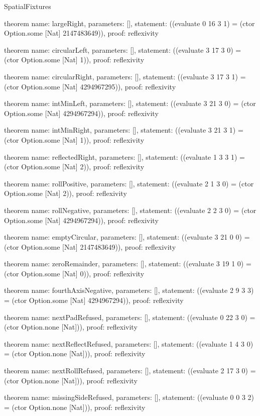 \begin{lexlean}{SpatialFixtures}
\begin{semanticmodule}
theorem{
  name: largeRight,
  parameters: [],
  statement: ((evaluate 0 16 3 1) = (ctor Option.some [Nat] 2147483649)),
  proof: reflexivity{}
}

theorem{
  name: circularLeft,
  parameters: [],
  statement: ((evaluate 3 17 3 0) = (ctor Option.some [Nat] 1)),
  proof: reflexivity{}
}

theorem{
  name: circularRight,
  parameters: [],
  statement: ((evaluate 3 17 3 1) = (ctor Option.some [Nat] 4294967295)),
  proof: reflexivity{}
}

theorem{
  name: intMinLeft,
  parameters: [],
  statement: ((evaluate 3 21 3 0) = (ctor Option.some [Nat] 4294967294)),
  proof: reflexivity{}
}

theorem{
  name: intMinRight,
  parameters: [],
  statement: ((evaluate 3 21 3 1) = (ctor Option.some [Nat] 1)),
  proof: reflexivity{}
}

theorem{
  name: reflectedRight,
  parameters: [],
  statement: ((evaluate 1 3 3 1) = (ctor Option.some [Nat] 2)),
  proof: reflexivity{}
}

theorem{
  name: rollPositive,
  parameters: [],
  statement: ((evaluate 2 1 3 0) = (ctor Option.some [Nat] 2)),
  proof: reflexivity{}
}

theorem{
  name: rollNegative,
  parameters: [],
  statement: ((evaluate 2 2 3 0) = (ctor Option.some [Nat] 4294967294)),
  proof: reflexivity{}
}

theorem{
  name: emptyCircular,
  parameters: [],
  statement: ((evaluate 3 21 0 0) = (ctor Option.some [Nat] 2147483649)),
  proof: reflexivity{}
}

theorem{
  name: zeroRemainder,
  parameters: [],
  statement: ((evaluate 3 19 1 0) = (ctor Option.some [Nat] 0)),
  proof: reflexivity{}
}

theorem{
  name: fourthAxisNegative,
  parameters: [],
  statement: ((evaluate 2 9 3 3) = (ctor Option.some [Nat] 4294967294)),
  proof: reflexivity{}
}

theorem{
  name: nextPadRefused,
  parameters: [],
  statement: ((evaluate 0 22 3 0) = (ctor Option.none [Nat])),
  proof: reflexivity{}
}

theorem{
  name: nextReflectRefused,
  parameters: [],
  statement: ((evaluate 1 4 3 0) = (ctor Option.none [Nat])),
  proof: reflexivity{}
}

theorem{
  name: nextRollRefused,
  parameters: [],
  statement: ((evaluate 2 17 3 0) = (ctor Option.none [Nat])),
  proof: reflexivity{}
}

theorem{
  name: missingSideRefused,
  parameters: [],
  statement: ((evaluate 0 0 3 2) = (ctor Option.none [Nat])),
  proof: reflexivity{}
}


\end{semanticmodule}
\end{lexlean}
